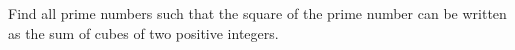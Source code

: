 Find all prime numbers such that the square of the prime number can be written as the sum of cubes of two positive integers.
